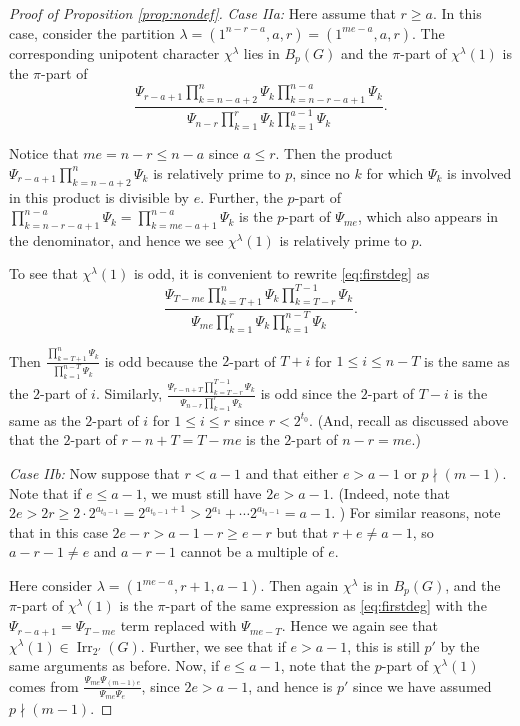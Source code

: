 \documentclass[12pt,leqno,a4paper]{amsart}
\newcommand{\Irr}{{\operatorname{Irr}}}
\theoremstyle{remark}
\begin{document}
\begin{proof}[Proof of Proposition \ref{prop:nondef}]
\emph{Case IIa:} Here assume that $r\geq a$.  In this case, consider the partition $\lambda=(1^{n-r-a}, a, r)=(1^{me-a}, a, r)$.  The corresponding unipotent character $\chi^\lambda$ lies in $B_{p}(G)$ and the $\pi$-part of $\chi^\lambda(1)$ is the $\pi$-part of 
\begin{equation}\label{eq:firstdeg}
\frac{\Psi_{r-a+1}\prod_{k=n-a+2}^n \Psi_k \prod_{k=n-r-a+1}^{n-a}\Psi_k}{\Psi_{n-r}\prod_{k=1}^{r}\Psi_k\prod_{k=1}^{a-1}\Psi_k}.
\end{equation}

Notice that $me=n-r\leq n-a$ since $a\leq r$.  Then the product $\Psi_{r-a+1}\prod_{k=n-a+2}^n \Psi_k$ is relatively prime to $p$, since no $k$ for which $\Psi_k$ is involved in this product is divisible by $e$.  Further, the $p$-part of $\prod_{k=n-r-a+1}^{n-a}\Psi_k=\prod_{k=me-a+1}^{n-a}\Psi_k$ is the $p$-part of $\Psi_{me}$, which also appears in the denominator, and hence we see $\chi^\lambda(1)$ is relatively prime to $p$.

To see that $\chi^\lambda(1)$ is odd, it is convenient to rewrite \eqref{eq:firstdeg} as 
\[\frac{\Psi_{T-me}\prod_{k=T+1}^n \Psi_k \prod_{k=T-r}^{T-1}\Psi_k}{\Psi_{me}\prod_{k=1}^{r}\Psi_k\prod_{k=1}^{n-T}\Psi_k}.\]

Then $\frac{\prod_{k=T+1}^n \Psi_k}{\prod_{k=1}^{n-T}\Psi_k}$ is odd because the $2$-part of $T+i$ for $1\leq i\leq n-T$ is the same as the $2$-part of $i$.  
Similarly, $\frac{\Psi_{r-n+T} \prod_{k=T-r}^{T-1}\Psi_k}{\Psi_{n-r}\prod_{k=1}^{r}\Psi_k}$ is odd since the $2$-part of $T-i$ is the same as the $2$-part of $i$ for $1\leq i\leq r$ since $r<2^{t_0}$.  (And, recall as discussed above that 
the $2$-part of $r-n+T=T-me$ is the $2$-part of $n-r=me$.)

\smallskip

\emph{Case IIb:} Now suppose that $r<a-1$ and that either $e>a-1$ or $p\nmid (m-1)$. Note that if $e\leq a-1$, we must still have $2e>a-1$. (Indeed, note that $2e>2r\geq 2\cdot 2^{a_{t_0-1}}=2^{a_{t_0-1}+1}>2^{a_1}+\cdots 2^{a_{t_0-1}}=a-1$. )  For similar reasons, note that in this case $2e-r> a-1-r\geq e-r$ but that $r+e\neq a-1$, so $a-r-1\neq e$ and $a-r-1$ cannot be a multiple of $e$.

 Here consider $\lambda=(1^{me-a}, r+1, a-1)$.  Then again $\chi^\lambda$ is in $B_p(G)$, and the $\pi$-part of $\chi^\lambda(1)$ is the $\pi$-part of the same expression as \eqref{eq:firstdeg} with the $\Psi_{r-a+1}=\Psi_{T-me}$ term replaced with $\Psi_{me-T}$.  Hence we again see that $\chi^\lambda(1)\in\Irr_{2'}(G)$.  Further, we see that if $e>a-1$, this is still $p'$ by the same arguments as before.  Now, if $e\leq a-1$, note that the $p$-part of $\chi^\lambda(1)$ comes from $\frac{\Psi_{me}\Psi_{(m-1)e}}{\Psi_{me}\Psi_e}$, since $2e>a-1$, and hence is $p'$ since we have assumed $p\nmid (m-1)$.




\end{proof}
\end{document}
